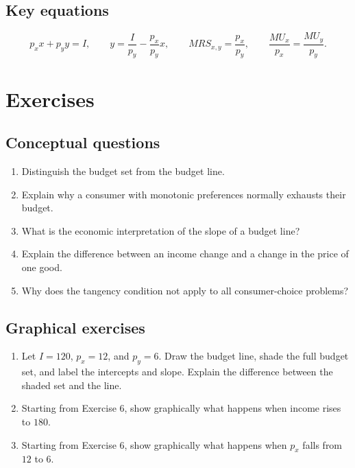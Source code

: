 \subsection*{Key equations}
\[
p_xx+p_yy=I,
\qquad
y=\frac{I}{p_y}-\frac{p_x}{p_y}x,
\qquad
MRS_{x,y}=\frac{p_x}{p_y},
\qquad
\frac{MU_x}{p_x}=\frac{MU_y}{p_y}.
\]

\section*{Exercises}

\subsection*{Conceptual questions}
\begin{enumerate}[label=\arabic*.]
  \item Distinguish the budget set from the budget line.
  \item Explain why a consumer with monotonic preferences normally exhausts their budget.
  \item What is the economic interpretation of the slope of a budget line?
  \item Explain the difference between an income change and a change in the price of one good.
  \item Why does the tangency condition not apply to all consumer-choice problems?
\end{enumerate}

\subsection*{Graphical exercises}
\begin{enumerate}[resume,label=\arabic*.]
  \item Let $I=120$, $p_x=12$, and $p_y=6$. Draw the budget line, shade the full budget set, and label the intercepts and slope. Explain the difference between the shaded set and the line.
  \item Starting from Exercise 6, show graphically what happens when income rises to $180$.
  \item Starting from Exercise 6, show graphically what happens when $p_x$ falls from $12$ to $6$.
\end{enumerate}

